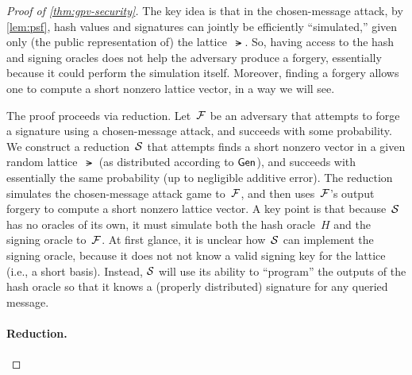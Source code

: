 \documentclass[11pt]{article}
\begin{document}
\begin{proof}[Proof of \cref{thm:gpv-security}]
  The key idea is that in the chosen-message attack, by
  \cref{lem:psf}, hash values and signatures can jointly be
  efficiently ``simulated,'' given only (the public representation of)
  the lattice~$\lat$. So, having access to the hash and signing
  oracles does not help the adversary produce a forgery, essentially
  because it could perform the simulation itself. Moreover, finding a
  forgery allows one to compute a short nonzero lattice vector, in a
  way we will see.

  The proof proceeds via reduction. Let~$\mathcal{F}$ be an adversary that
  attempts to forge a signature using a chosen-message attack, and
  succeeds with some probability. We construct a reduction~$\mathcal{S}$ that
  attempts finds a short nonzero vector in a given random
  lattice~$\lat$ (as distributed according to $\mathsf{Gen}$), and succeeds
  with essentially the same probability (up to negligible additive
  error). The reduction simulates the chosen-message attack game
  to~$\mathcal{F}$, and then uses~$\mathcal{F}$'s output forgery to compute a
  short nonzero lattice vector. A key point is that because~$\mathcal{S}$ has
  no oracles of its own, it must simulate both the hash oracle~$H$ and
  the signing oracle to~$\mathcal{F}$. At first glance, it is unclear
  how~$\mathcal{S}$ can implement the signing oracle, because it does not not
  know a valid signing key for the lattice (i.e., a short basis).
  Instead, $\mathcal{S}$ will use its ability to ``program'' the outputs of
  the hash oracle so that it knows a (properly distributed) signature
  for any queried message.

  \paragraph{Reduction.}


\end{proof}
\end{document}

